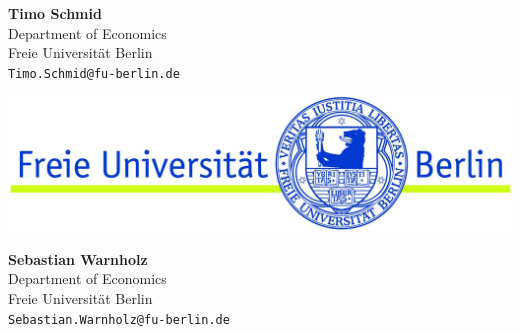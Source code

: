 \documentclass[a0,portrait]{a0poster}\usepackage[]{graphicx}\usepackage[]{color}
\begin{document}
\begin{multicols}{2}
\color{DarkSlateGray} %


\nocite{*} %

\end{multicols}


\vfill
\vspace{0.5cm}
\begin{minipage}[b]{0.3\linewidth}
  \Large\textbf{Timo Schmid}\\[0.5cm]
  \large 
  Department of Economics\\
  Freie Universit\"at Berlin\\
  \texttt{Timo.Schmid@fu-berlin.de}
\end{minipage}
\hfill
\begin{minipage}[b]{0.3\linewidth}
\includegraphics[width=\linewidth]{FuBerlin}
\end{minipage}
\hfill
\begin{minipage}[b]{0.3\linewidth}
\begin{flushright}
  \Large\textbf{Sebastian Warnholz}\\[0.5cm]
  \large 
  Department of Economics\\
  Freie Universit\"at Berlin\\
  \texttt{Sebastian.Warnholz@fu-berlin.de}
\end{flushright}
\end{minipage}
%

\end{document}
